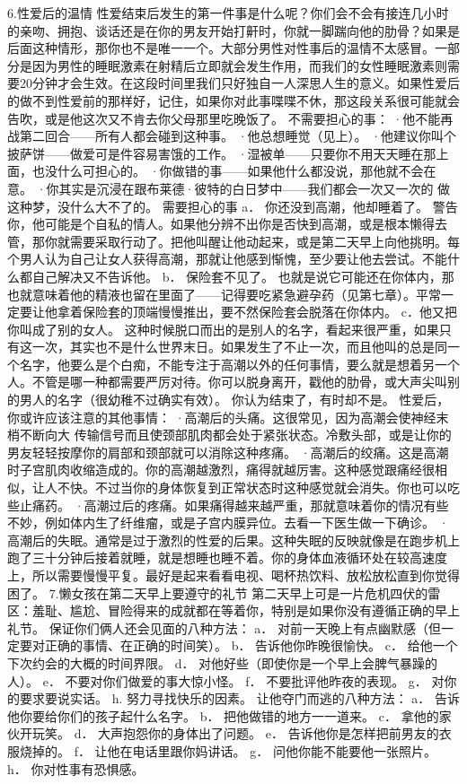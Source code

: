 \documentclass[12pt,UTF8,openany]{ctexbook}
\begin{document}
6.性爱后的温情
性爱结束后发生的第一件事是什么呢？你们会不会有接连几小时的亲吻、拥抱、谈话还是在你的男友开始打鼾时，你就一脚踹向他的肋骨？如果是后面这种情形，那你也不是唯一一个。大部分男性对性事后的温情不太感冒。一部分是因为男性的睡眠激素在射精后立即就会发生作用，而我们的女性睡眠激素则需要20分钟才会生效。在这段时间里我们只好独自一人深思人生的意义。如果性爱后的做不到性爱前的那样好，记住，如果你对此事喋喋不休，那这段关系很可能就会告吹，或是他这次又不肯去你父母那里吃晚饭了。
不需要担心的事：
·他不能再战第二回合——所有人都会碰到这种事。
·他总想睡觉（见上）。
·他建议你叫个披萨饼——做爱可是件容易害饿的工作。
·湿被单——只要你不用天天睡在那上面，也没什么可担心的。
·你做错的事——如果他什么都没说，那他就不会在意。
·你其实是沉浸在跟布莱德·彼特的白日梦中——我们都会一次又一次的 做这种梦，没什么大不了的。
需要担心的事
a． 你还没到高潮，他却睡着了。
警告你，他可能是个自私的情人。如果他分辨不出你是否快到高潮，或是根本懒得去管，那你就需要采取行动了。把他叫醒让他动起来，或是第二天早上向他挑明。每个男人认为自己让女人获得高潮，那就让他感到惭愧，至少要让他去尝试。不能什么都自己解决又不告诉他。
b． 保险套不见了。
也就是说它可能还在你体内，那也就意味着他的精液也留在里面了——记得要吃紧急避孕药（见第七章）。平常一定要让他拿着保险套的顶端慢慢推出，要不然保险套会脱落在你体内。
c．他又把你叫成了别的女人。
这种时候脱口而出的是别人的名字，看起来很严重，如果只有这一次，其实也不是什么世界末日。如果发生了不止一次，而且他叫的总是同一个名字，他要么是个白痴，不能专注于高潮以外的任何事情，要么就是想着另一个人。不管是哪一种都需要严厉对待。你可以脱身离开，戳他的肋骨，或大声尖叫别的男人的名字（很幼稚不过确实有效）。
你认为结束了，有时却不是。
性爱后，你或许应该注意的其他事情：
·高潮后的头痛。这很常见，因为高潮会使神经末梢不断向大
传输信号而且使颈部肌肉都会处于紧张状态。冷敷头部，或是让你的男友轻轻按摩你的肩部和颈部就可以消除这种疼痛。
·高潮后的绞痛。这是高潮时子宫肌肉收缩造成的。你的高潮越激烈，痛得就越厉害。这种感觉跟痛经很相似，让人不快。不过当你的身体恢复到正常状态时这种感觉就会消失。你也可以吃些止痛药。
·高潮过后的疼痛。如果痛得越来越严重，那就意味着你的情况有些不妙，例如体内生了纤维瘤，或是子宫内膜异位。去看一下医生做一下确诊。
·高潮后的失眠。通常是过于激烈的性爱的后果。这种失眠的反映就像是在跑步机上跑了三十分钟后接着就睡，就是想睡也睡不着。你的身体血液循环处在较高速度上，所以需要慢慢平复。最好是起来看看电视、喝杯热饮料、放松放松直到你觉得困了。
7.懒女孩在第二天早上要遵守的礼节
第二天早上可是一片危机四伏的雷区：羞耻、尴尬、冒险得来的成就都在等着你，特别是如果你没有遵循正确的早上礼节。
保证你们俩人还会见面的八种方法：
a． 对前一天晚上有点幽默感（但一定要对正确的事情、在正确的时间笑）。
b． 告诉他你昨晚很愉快。
c． 给他一个下次约会的大概的时间界限。
d． 对他好些（即使你是一个早上会脾气暴躁的人）。
e． 不要对你们做爱的事大惊小怪。
f． 不要批评他昨夜的表现。
g． 对你的要求要说实话。
h. 努力寻找快乐的因素。
让他夺门而逃的八种方法：
a． 告诉他你要给你们的孩子起什么名字。
b． 把他做错的地方一一道来。
c． 拿他的家伙开玩笑。
d． 大声抱怨你的身体出了问题。
e． 告诉他你是怎样把前男友的衣服烧掉的。
f． 让他在电话里跟你妈讲话。
g． 问他你能不能要他一张照片。
h． 你对性事有恐惧感。
\end{document}
